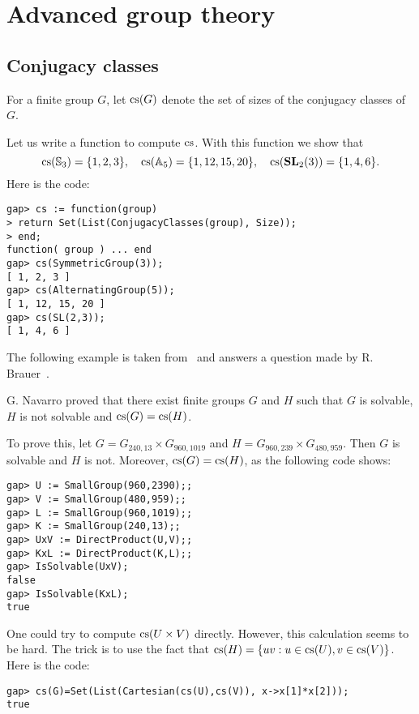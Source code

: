 \chapter{Advanced group theory}
\section{Conjugacy classes}

For a finite group $G$, let $\operatorname{cs}(G)$ denote the set of sizes of the conjugacy
classes of $G$. 

\begin{example}
  Let us write a function to compute $\operatorname{cs}$. With this function we show that
  \[
    \operatorname{cs}(\mathbb{S}_3)=\{1,2,3\},
    \quad
    \operatorname{cs}(\mathbb{A}_5)=\{1,12,15,20\},
    \quad
    \operatorname{cs}(\mathbf{SL}_2(3))=\{1,4,6\}.
  \]
  Here is the code:
\begin{lstlisting}
gap> cs := function(group)
> return Set(List(ConjugacyClasses(group), Size));
> end;
function( group ) ... end
gap> cs(SymmetricGroup(3));
[ 1, 2, 3 ]
gap> cs(AlternatingGroup(5));
[ 1, 12, 15, 20 ]
gap> cs(SL(2,3));
[ 1, 4, 6 ]
\end{lstlisting}
\end{example}

The following example is taken from~\cite[Theorem A]{MR3210919} and
answers a question made by R. Brauer~\cite[Question 2(ii)]{MR2875589}.

\begin{example}
  G. Navarro proved that there exist finite groups $G$ and $H$ such that $G$ is
  solvable, $H$ is not solvable and $\operatorname{cs}(G)=\operatorname{cs}(H)$.

  To prove this, let $G=G_{240,13}\times G_{960,1019}$ and
  $H=G_{960,239}\times G_{480,959}$.  Then $G$ is solvable and $H$ is not. Moreover, 
  $\operatorname{cs}(G)=\operatorname{cs}(H)$, as the following code shows:
\begin{lstlisting}
gap> U := SmallGroup(960,2390);;
gap> V := SmallGroup(480,959);;
gap> L := SmallGroup(960,1019);;
gap> K := SmallGroup(240,13);;
gap> UxV := DirectProduct(U,V);;
gap> KxL := DirectProduct(K,L);;
gap> IsSolvable(UxV);
false
gap> IsSolvable(KxL);
true
\end{lstlisting}
One could try to compute $\operatorname{cs}(U\times V)$ directly. However, this calculation
seems to be hard. The trick is to use the fact that 
$\operatorname{cs}(H)=\{uv:u\in\operatorname{cs}(U),v\in\operatorname{cs}(V)\}$. Here is the code:
\begin{lstlisting}
gap> cs(G)=Set(List(Cartesian(cs(U),cs(V)), x->x[1]*x[2]));
true
\end{lstlisting}
\end{example}

